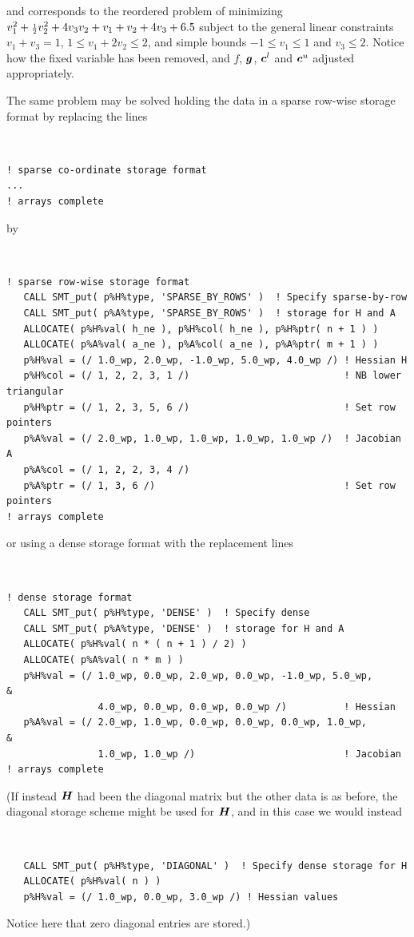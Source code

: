 \documentclass{galahad}
\begin{document}
\noindent
and corresponds to the reordered problem of minimizing 
$v_1^2 + {\scriptstyle \frac{1}{2}} v_2^2 + 4 v_3 v_2 + v_1 + v_2 + 4 v_3 + 6.5$ 
subject to the general linear constraints 
$v_1 + v_3 = 1$, $1 \leq v_1 + 2 v_2 \leq 2$, 
and simple bounds 
$-1 \leq v_1 \leq 1$ and $v_3 \leq 2$. Notice how the 
fixed variable has been removed, and $f$, ${\bm{g}}$, ${\bm{c}}^l$ and ${\bm{c}}^u$ 
adjusted appropriately. 

The same problem may be solved holding the data in 
a sparse row-wise storage format by replacing the lines
{\tt \small
\begin{verbatim}
! sparse co-ordinate storage format
...
! arrays complete   
\end{verbatim}
}
\noindent
by
{\tt \small
\begin{verbatim}
! sparse row-wise storage format
   CALL SMT_put( p%H%type, 'SPARSE_BY_ROWS' )  ! Specify sparse-by-row
   CALL SMT_put( p%A%type, 'SPARSE_BY_ROWS' )  ! storage for H and A
   ALLOCATE( p%H%val( h_ne ), p%H%col( h_ne ), p%H%ptr( n + 1 ) )
   ALLOCATE( p%A%val( a_ne ), p%A%col( a_ne ), p%A%ptr( m + 1 ) )
   p%H%val = (/ 1.0_wp, 2.0_wp, -1.0_wp, 5.0_wp, 4.0_wp /) ! Hessian H
   p%H%col = (/ 1, 2, 2, 3, 1 /)                           ! NB lower triangular
   p%H%ptr = (/ 1, 2, 3, 5, 6 /)                           ! Set row pointers
   p%A%val = (/ 2.0_wp, 1.0_wp, 1.0_wp, 1.0_wp, 1.0_wp /)  ! Jacobian A
   p%A%col = (/ 1, 2, 2, 3, 4 /)
   p%A%ptr = (/ 1, 3, 6 /)                                 ! Set row pointers  
! arrays complete 
\end{verbatim}
}
\noindent
or using a dense storage format with the replacement lines
{\tt \small
\begin{verbatim}
! dense storage format
   CALL SMT_put( p%H%type, 'DENSE' )  ! Specify dense
   CALL SMT_put( p%A%type, 'DENSE' )  ! storage for H and A
   ALLOCATE( p%H%val( n * ( n + 1 ) / 2) )
   ALLOCATE( p%A%val( n * m ) )
   p%H%val = (/ 1.0_wp, 0.0_wp, 2.0_wp, 0.0_wp, -1.0_wp, 5.0_wp,              &
                4.0_wp, 0.0_wp, 0.0_wp, 0.0_wp /)          ! Hessian
   p%A%val = (/ 2.0_wp, 1.0_wp, 0.0_wp, 0.0_wp, 0.0_wp, 1.0_wp,               &
                1.0_wp, 1.0_wp /)                          ! Jacobian
! arrays complete 
\end{verbatim}
}
\noindent
(If instead ${\bm{H}}$ had been the diagonal matrix
but the other data is as before, the diagonal storage scheme 
might be used for ${\bm{H}}$, and in this case we would instead 
{\tt \small
\begin{verbatim}
   CALL SMT_put( p%H%type, 'DIAGONAL' )  ! Specify dense storage for H
   ALLOCATE( p%H%val( n ) )
   p%H%val = (/ 1.0_wp, 0.0_wp, 3.0_wp /) ! Hessian values
\end{verbatim}
}
\noindent
Notice here that zero diagonal entries are stored.)
\end{document}
